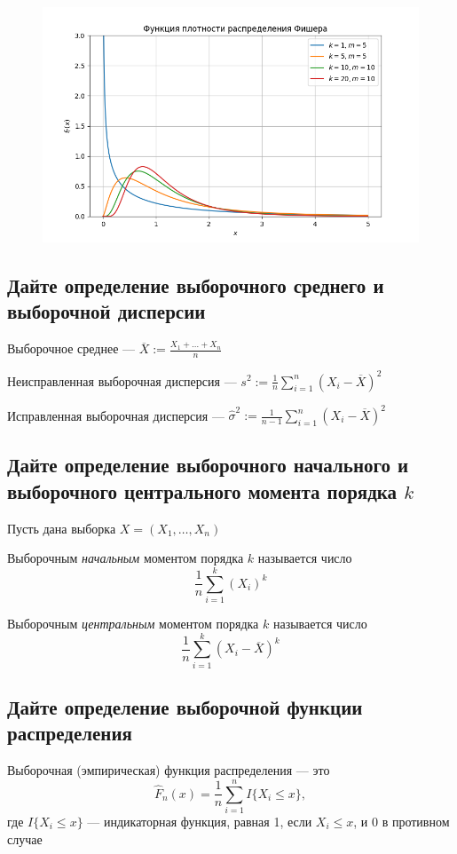 \documentclass{article}
\begin{document}
\begin{figure}[h]
    \centering
    \includegraphics[width=0.8\linewidth]{fisher.png}
\end{figure}

\subsection{Дайте определение выборочного среднего и выборочной дисперсии}
 Выборочное среднее — $\overline{X}:=\displaystyle\frac{X_1+\ldots+X_n}{n}$

 Неисправленная выборочная дисперсия — $s^2:=\displaystyle\frac{1}{n}\sum_{i=1}^n (X_i-\overline{X})^2$

 Исправленная выборочная дисперсия — $\widehat{\sigma}^2:=\displaystyle\frac{1}{n-1}\sum_{i=1}^n (X_i-\overline{X})^2$


\subsection{Дайте определение выборочного начального и выборочного центрального момента порядка $k$}
Пусть дана выборка $X=(X_1,\ldots,X_n)$

 Выборочным \textit{начальным} моментом порядка $k$ называется число 
\begin{equation*}
    \frac{1}{n}\sum_{i=1}^{k}(X_i)^k
\end{equation*}

 Выборочным \textit{центральным} моментом порядка $k$ называется число
\begin{equation*}
    \frac{1}{n}\sum_{i=1}^{k}(X_i-\overline{X})^k
\end{equation*}



\subsection{Дайте определение выборочной функции распределения}
 Выборочная (эмпирическая) функция распределения — это $$\hat{F}_n(x)=\frac{1}{n}\sum_{i=1}^{n}I\{X_i\leqslant x\},$$ где $I\{X_i\leqslant x\}$ — индикаторная функция, равная 1, если $X_i\leqslant x$, и 0 в противном случае
\end{document}
